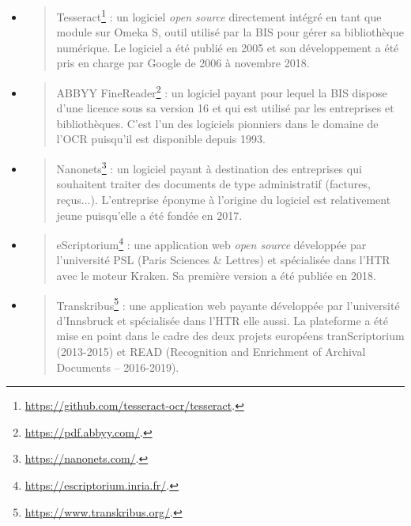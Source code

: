\documentclass[a4paper,12pt,twoside]{book}
\begin{document}
	\begin{itemize}
		\item
		\begin{quote}
			Tesseract\footnote{\url{https://github.com/tesseract-ocr/tesseract}.}
			: un logiciel \emph{open source} directement intégré en tant que
			module sur Omeka S, outil utilisé par la BIS pour gérer sa
			bibliothèque numérique. Le logiciel a été publié en 2005 et son
			développement a été pris en charge par Google de 2006 à novembre 2018.
		\end{quote}
		\item
		\begin{quote}
			ABBYY FineReader\footnote{\url{https://pdf.abbyy.com/}.}
			: un logiciel payant pour lequel la BIS dispose d'une licence sous sa
			version 16 et qui est utilisé par les entreprises et bibliothèques.
			C'est l'un des logiciels pionniers dans le domaine de l'OCR puisqu'il
			est disponible depuis 1993.
		\end{quote}
		\item
		\begin{quote}
			Nanonets\footnote{\url{https://nanonets.com/}.}
			: un logiciel payant à destination des entreprises qui souhaitent
			traiter des documents de type administratif (factures, reçus...).
			L'entreprise éponyme à l'origine du logiciel est relativement jeune
			puisqu'elle a été fondée en 2017.
		\end{quote}
		\item
		\begin{quote}
			eScriptorium\footnote{\url{https://escriptorium.inria.fr/}.}
			: une application web \emph{open source} développée par l'université
			PSL (Paris Sciences \& Lettres) et spécialisée dans l'HTR avec le
			moteur Kraken. Sa première version a été publiée en 2018.
		\end{quote}
		\item
		\begin{quote}
			Transkribus\footnote{\url{https://www.transkribus.org/}.}
			: une application web payante développée par l'université d'Innsbruck
			et spécialisée dans l'HTR elle aussi. La plateforme a été mise en
			point dans le cadre des deux projets européens tranScriptorium
			(2013-2015) et READ (Recognition and Enrichment of Archival Documents
			-- 2016-2019). \\
		\end{quote}
	\end{itemize}
	
\end{document}
